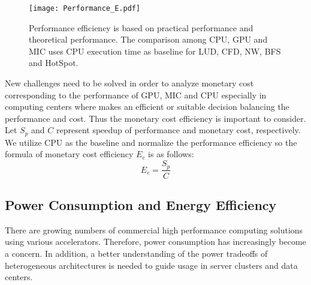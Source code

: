 
    \begin{figure}[h!]
  \centering
  \begin{minipage}{0.5\textwidth}
    \centering
   \centering
     \texttt{[image: Performance\_E.pdf]}  

\caption{Performance efficiency is based on practical performance and theoretical performance. The comparison among CPU, GPU and MIC uses CPU execution time as baseline for LUD, CFD, NW, BFS and HotSpot.}
\label{fig:performanceE}
\end{minipage}%
\end{figure}


    
New challenges need to be solved in order to analyze monetary cost corresponding to the performance of GPU, MIC and CPU especially in computing centers where makes an efficient or suitable decision balancing the performance and cost. Thus the monetary cost efficiency is important to consider. Let $S_{p}$ and $C$ represent speedup of performance and monetary cost, respectively. We utilize CPU as the baseline and normalize the performance efficiency so the formula of monetary cost efficiency $E_{c}$ is as follows:
\begin{equation}\label{equ:monetaryE}
	{E_{c}} = \frac{S_{p}}{C}
\end{equation}
  

  
\subsection{Power Consumption and Energy Efficiency}

There are growing numbers of commercial high performance computing solutions using various accelerators. Therefore, power consumption has increasingly become a concern. In addition, a better understanding of the power tradeoffs of heterogeneous architectures is needed to guide usage in server clusters and data centers. 

